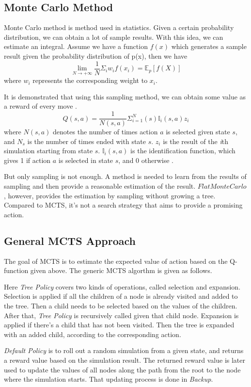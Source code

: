 \documentclass[a4paper,12pt]{article}
\begin{document}
\subsection{Monte Carlo Method} \cite{case1}
Monte Carlo method is method used in statistics. Given a certain probability distribution, we can obtain a lot of sample results. With this idea, we can estimate an integral. Assume we have a function $f(x)$ which generates a sample result given the probability distribution of p(x), then we have
$$
{\lim_{N \to +\infty}}\frac{1}{N}\Sigma_i w_if(x_i) = \mathbb{E}_p[f(X)] $$
where $w_i$ represents the corresponding weight to $x_i$. 

It is demonstrated that using this sampling method, we can obtain some value as a reward of every move \cite{case2}.
$$
Q(s,a) = \frac{1}{N(s,a)}\Sigma_{i=1}^N(s)\mathbb{I}_i(s,a)z_i
$$
where $N(s,a)$ denotes the number of times action $a$ is selected given state $s$, and $N_s$
is the number of times ended with
state $s$.
$z_i$ is the result of the \textit{i}th simulation
starting from state $s$. $\mathbb{I}_i(s,a)$ is the identification function, which gives 1 if action $a$ is selected in state $s$, and 0 otherwise \cite{case2}.

But only sampling is not enough. A method is needed to learn from the results of sampling and then provide a reasonable estimation of the result. 
$Flat Monte Carlo$, however, provides the estimation by sampling without growing a tree\cite{case2}. Compared to MCTS, it's not a search strategy that aims to provide a promising action. 

\subsection{General MCTS Approach} 

The goal of MCTS is to estimate the expected value of action based on the Q-function given above. 
The generic MCTS algorthm is given as follows.

Here \textit{Tree Policy} covers two kinds of operations, called selection and expansion.
Selection is applied if all the children of a node is already visited and added to the tree. Then a child needs to be selected based on the values of the children. After that, \textit{Tree Policy} is recursively called given that child node.
Expansion is applied if there's a child that has not been visited. Then the tree is expanded with an added child, according to the corresponding action.

\textit{Default Policy} is to roll out a random simulation from a given state, and returns a reward value based on the simulation result. The returned reward value is later used to update the values of all nodes along the path from the root to the node where the simulation starts. That updating process is done in \textit{Backup}.
\end{document}
